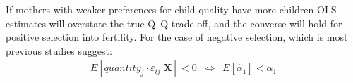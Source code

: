 \documentclass[subeqn]{article}
\begin{document}
\begin{spacing}{1.4}

If mothers with weaker preferences for child quality have more children 
OLS estimates will overstate the true Q--Q trade-off, and the converse will hold for positive selection into fertility.
For the case of negative selection, which is most previous studies suggest:
\begin{eqnarray}
  E[quantity_{j}\cdot\varepsilon_{ij}|\bm{X}] < 0 &\Leftrightarrow& E[\hat\alpha_1] < \alpha_1 \nonumber 
\end{eqnarray}



\end{spacing}
\end{document}
